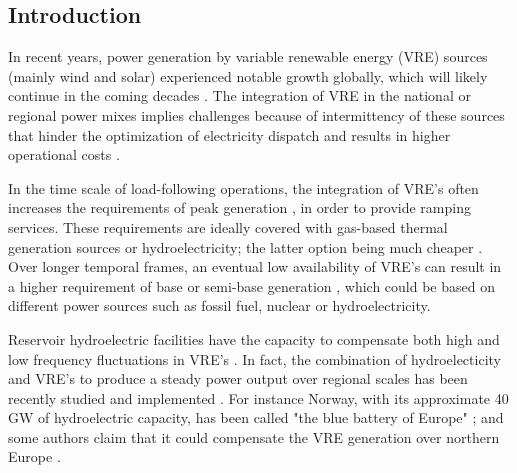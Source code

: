 \documentclass[AMA,Times1COL]{WileyNJDv5} %
\begin{document}
\begin{linenumbers}



\maketitle



\section{Introduction}\label{sec1}

In recent years, power generation by variable renewable energy (VRE) sources (mainly wind and solar) experienced notable growth globally, which will likely continue in the coming decades \cite{ren212020global}. The integration of VRE in the national or regional power mixes implies challenges because of intermittency of these sources \cite{cosseron2013characterization, franccois2014integrating, grams2017balancing} that hinder the optimization of electricity dispatch and results in higher operational costs \cite{albadi2010overview}.

In the time scale of load-following operations, the integration of VRE's often increases the requirements of peak generation \cite{widen2011correlations}, in order to provide ramping services. These requirements are ideally covered with gas-based thermal generation sources or hydroelectricity; the latter option being much cheaper \cite{acker2012integration, peter2017energy}. Over longer temporal frames, an eventual low availability of VRE's can result in a higher requirement of base or semi-base generation \cite{wan1993factors,franccois2017assessing}, which could be based on different power sources such as fossil fuel, nuclear or hydroelectricity. 

Reservoir hydroelectric facilities have the capacity to compensate both high and low frequency fluctuations in VRE's \cite{wan1993factors,franccois2017assessing}. In fact, the combination of hydroelecticity and VRE's to produce a steady power output over regional scales has been recently studied and implemented \cite{chakrabarti2011wind, chakrabarti2012balancing}. For instance Norway, with its approximate 40 GW of hydroelectric capacity, has been called "the blue battery of Europe" \cite{danielo2013norway}; and some authors claim that it could compensate the VRE generation over northern Europe \cite{graabak2017norway}. 


\end{linenumbers}
\end{document}

